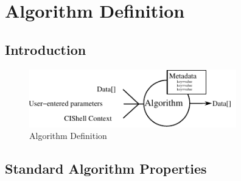 \section{Algorithm Definition}
\subsection{Introduction}

\begin{figure}[htb!]
\centering
\includegraphics[width=90mm]{../img/algorithmDefn.pdf}
\caption{Algorithm Definition}
\label{fig:algorithmDefn}
\end{figure}


\subsection{Standard Algorithm Properties}
\orgcishellframeworkalgorithm{}
